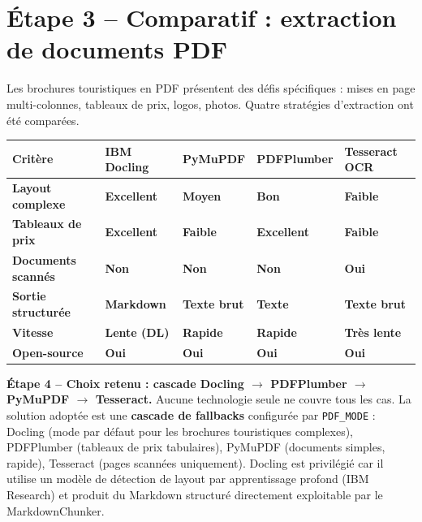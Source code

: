 \documentclass[12pt,a4paper]{report}
\begin{document}
\section{\'{E}tape 3 -- Comparatif : extraction de documents PDF}

Les brochures touristiques en PDF pr\'{e}sentent des d\'{e}fis sp\'{e}cifiques :
mises en page multi-colonnes, tableaux de prix, logos, photos.
Quatre strat\'{e}gies d'extraction ont \'{e}t\'{e} compar\'{e}es.

\begin{center}
\renewcommand{\arraystretch}{1.5}
\begin{tabularx}{\linewidth}{>{\bfseries\small}p{2.8cm} X X X X}
  \toprule
  \rowcolor{rowblue}
  \textbf{Crit\`{e}re} & \textbf{IBM Docling} & \textbf{PyMuPDF} & \textbf{PDFPlumber} & \textbf{Tesseract OCR} \\
  \midrule
  Layout complexe   & \cellcolor{rowgreen}\textbf{Excellent}     & \cellcolor{warnorange!30}\textbf{Moyen}     & \cellcolor{warnorange!30}\textbf{Bon}     & \cellcolor{rowred}\textbf{Faible}    \\
  Tableaux de prix  & \cellcolor{rowgreen}\textbf{Excellent}     & \cellcolor{rowred}\textbf{Faible}           & \cellcolor{rowgreen}\textbf{Excellent}   & \cellcolor{rowred}\textbf{Faible}    \\
  Documents scann\'{e}s& \cellcolor{rowred}\textbf{Non}           & \cellcolor{rowred}\textbf{Non}              & \cellcolor{rowred}\textbf{Non}           & \cellcolor{rowgreen}\textbf{Oui}     \\
  Sortie structur\'{e}e& \cellcolor{rowgreen}\textbf{Markdown}   & \cellcolor{warnorange!30}\textbf{Texte brut}& \cellcolor{warnorange!30}\textbf{Texte}  & \cellcolor{rowred}\textbf{Texte brut}\\
  Vitesse           & \cellcolor{rowred}\textbf{Lente (DL)}      & \cellcolor{rowgreen}\textbf{Rapide}         & \cellcolor{rowgreen}\textbf{Rapide}      & \cellcolor{rowred}\textbf{Tr\`{e}s lente} \\
  Open-source       & \cellcolor{rowgreen}\textbf{Oui}           & \cellcolor{rowgreen}\textbf{Oui}            & \cellcolor{rowgreen}\textbf{Oui}         & \cellcolor{rowgreen}\textbf{Oui}     \\
  \bottomrule
\end{tabularx}
\end{center}

\begin{successbox}
\textbf{\'{E}tape 4 -- Choix retenu : cascade Docling $\rightarrow$ PDFPlumber $\rightarrow$ PyMuPDF $\rightarrow$ Tesseract.}
Aucune technologie seule ne couvre tous les cas. La solution adopt\'{e}e est une
\textbf{cascade de fallbacks} configur\'{e}e par \texttt{PDF\_MODE} :
Docling (mode par d\'{e}faut pour les brochures touristiques complexes),
PDFPlumber (tableaux de prix tabulaires), PyMuPDF (documents simples, rapide),
Tesseract (pages scann\'{e}es uniquement). Docling est privil\'{e}gi\'{e} car il
utilise un mod\`{e}le de d\'{e}tection de layout par apprentissage profond
(IBM Research) et produit du Markdown structur\'{e} directement exploitable
par le MarkdownChunker.
\end{successbox}
\end{document}
